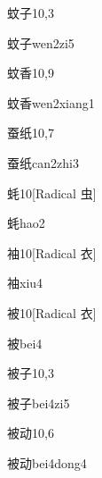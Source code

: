 \begin{entry}{蚊子}{10,3}
  \begin{phonetics}{蚊子}{wen2zi5}
  \end{phonetics}
\end{entry}

\begin{entry}{蚊香}{10,9}
  \begin{phonetics}{蚊香}{wen2xiang1}
  \end{phonetics}
\end{entry}

\begin{entry}{蚕纸}{10,7}
  \begin{phonetics}{蚕纸}{can2zhi3}
  \end{phonetics}
\end{entry}

\begin{entry}{蚝}{10}[Radical 虫]
  \begin{phonetics}{蚝}{hao2}
  \end{phonetics}
\end{entry}

\begin{entry}{袖}{10}[Radical 衣]
  \begin{phonetics}{袖}{xiu4}
  \end{phonetics}
\end{entry}

\begin{entry}{被}{10}[Radical 衣]
  \begin{phonetics}{被}{bei4}
  \end{phonetics}
\end{entry}

\begin{entry}{被子}{10,3}
  \begin{phonetics}{被子}{bei4zi5}
  \end{phonetics}
\end{entry}

\begin{entry}{被动}{10,6}
  \begin{phonetics}{被动}{bei4dong4}
  \end{phonetics}
\end{entry}

